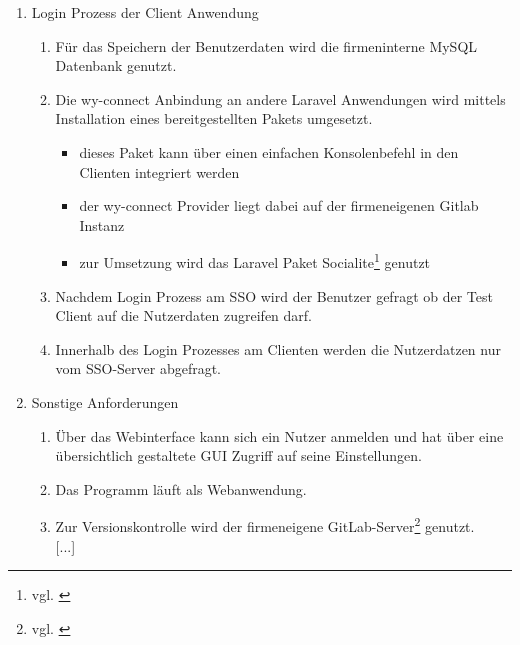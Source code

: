 \begin{enumerate}[itemsep=0em,partopsep=0em,parsep=0em,topsep=0em]
\item Login Prozess der Client Anwendung
		\begin{enumerate}
		\item Für das Speichern der Benutzerdaten wird die firmeninterne MySQL Datenbank genutzt. 
		\item Die wy-connect Anbindung an andere Laravel Anwendungen wird mittels Installation eines bereitgestellten Pakets umgesetzt.
		\begin{itemize}
		\item dieses Paket kann über einen einfachen Konsolenbefehl in den Clienten integriert werden
		\item der wy-connect Provider liegt dabei auf der firmeneigenen Gitlab Instanz
		\item zur Umsetzung wird das Laravel Paket Socialite\footnote{vgl. \cite{Socialite}} genutzt
	\end{itemize}
		\item Nachdem Login Prozess am \acs{SSO} wird der Benutzer gefragt ob der Test Client auf die Nutzerdaten zugreifen darf.
		\item Innerhalb des Login Prozesses am Clienten werden die Nutzerdatzen nur vom \acs{SSO}-Server abgefragt.
		\end{enumerate}
\item Sonstige Anforderungen
		\begin{enumerate}
		\item Über das Webinterface kann sich ein Nutzer anmelden und hat über eine übersichtlich gestaltete  \acs{GUI} Zugriff auf seine Einstellungen.
		\item Das Programm läuft als Webanwendung.
		\item Zur Versionskontrolle wird der firmeneigene GitLab-Server\footnote{vgl. \cite{GitLab}} genutzt.\\
		{[...]}
		\end{enumerate}
\end{enumerate}

